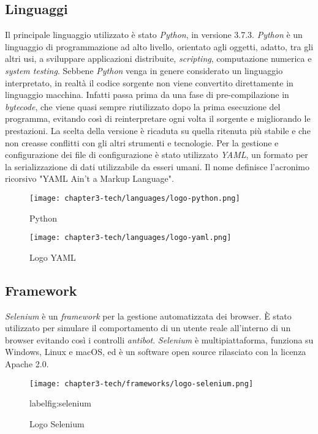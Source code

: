 \subsection{Linguaggi}
Il principale linguaggio utilizzato è stato \emph{Python}, in versione 3.7.3. \emph{Python} è un linguaggio di programmazione ad alto livello, orientato agli oggetti, adatto, tra gli altri usi, a sviluppare applicazioni distribuite, \emph{scripting}, computazione numerica e \emph{system testing}. Sebbene \emph{Python} venga in genere considerato un linguaggio interpretato, in realtà il codice sorgente non viene convertito direttamente in linguaggio macchina. Infatti passa prima da una fase di pre-compilazione in \emph{bytecode}, che viene quasi sempre riutilizzato dopo la prima esecuzione del programma, evitando così di reinterpretare ogni volta il sorgente e migliorando le prestazioni. La scelta della versione è ricaduta su quella ritenuta più stabile e che non creasse conflitti con gli altri strumenti e tecnologie.\newline{}
Per la gestione e configurazione dei file di configurazione è stato utilizzato \emph{YAML}, un formato per la serializzazione di dati utilizzabile da esseri umani. Il nome definisce l'acronimo ricorsivo "YAML Ain't a Markup Language".
\begin{figure}[!h]
    \begin{minipage}{.5\textwidth} 
        \centering 
        \texttt{[image: chapter3-tech/languages/logo-python.png]} 
        \caption{Python} 
        \label{fig:python} 
    \end{minipage}%
    \begin{minipage}{.5\textwidth} 
        \centering 
        \texttt{[image: chapter3-tech/languages/logo-yaml.png]} 
        \caption{Logo YAML} 
        \label{fig:yaml} 
    \end{minipage}%
\end{figure}
\subsection{Framework}
\emph{Selenium} è un \emph{framework} per la gestione automatizzata dei browser. È stato utilizzato per simulare il comportamento di un utente reale all'interno di un browser evitando così i controlli \emph{antibot}. \emph{Selenium} è multipiattaforma, funziona su Windows, Linux e macOS, ed è un software open source rilasciato con la licenza Apache 2.0.
\begin{figure}[!h] 
    \centering 
    \texttt{[image: chapter3-tech/frameworks/logo-selenium.png]} 
    \caption{Logo Selenium}
    label{fig:selenium} 
\end{figure}

